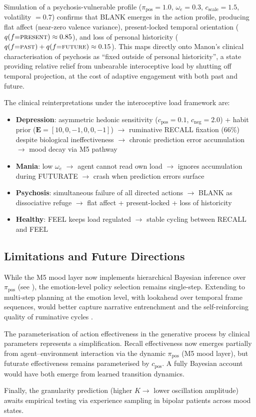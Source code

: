 \documentclass[11pt,a4paper]{article}
\begin{document}
Simulation of a psychosis-vulnerable profile ($\pi_{\text{pos}} = 1.0$, $\omega_e = 0.3$, $c_{\text{scale}} = 1.5$, volatility $= 0.7$) confirms that BLANK emerges in the action profile, producing flat affect (near-zero valence variance), present-locked temporal orientation ($q(f{=}\textsc{present}) \approx 0.85$), and loss of personal historicity ($q(f{=}\textsc{past}) + q(f{=}\textsc{future}) \approx 0.15$). This maps directly onto Manon's clinical characterisation of psychosis as ``fixed outside of personal historicity'', a state providing relative relief from unbearable interoceptive load by shutting off temporal projection, at the cost of adaptive engagement with both past and future.

The clinical reinterpretations under the interoceptive load framework are:
\begin{itemize}
    \item \textbf{Depression}: asymmetric hedonic sensitivity ($c_{\text{pos}} = 0.1$, $c_{\text{neg}} = 2.0$) + habit prior ($\mathbf{E} = [10, 0, -1, 0, 0, -1]$) $\to$ ruminative RECALL fixation (66\%) despite biological ineffectiveness $\to$ chronic prediction error accumulation $\to$ mood decay via M5 pathway
    \item \textbf{Mania}: low $\omega_e$ $\to$ agent cannot read own load $\to$ ignores accumulation during FUTURATE $\to$ crash when prediction errors surface
    \item \textbf{Psychosis}: simultaneous failure of all directed actions $\to$ BLANK as dissociative refuge $\to$ flat affect + present-locked + loss of historicity
    \item \textbf{Healthy}: FEEL keeps load regulated $\to$ stable cycling between RECALL and FEEL
\end{itemize}

\subsection{Limitations and Future Directions}

While the M5 mood layer now implements hierarchical Bayesian inference over $\pi_{\text{pos}}$ (see \citealt{albarracin2026temporal}), the emotion-level policy selection remains single-step. Extending to multi-step planning at the emotion level, with lookahead over temporal frame sequences, would better capture narrative entrenchment and the self-reinforcing quality of ruminative cycles \citep{hesp2021deeply}.

The parameterisation of action effectiveness in the generative process by clinical parameters represents a simplification. Recall effectiveness now emerges partially from agent--environment interaction via the dynamic $\pi_{\text{pos}}$ (M5 mood layer), but futurate effectiveness remains parameterised by $c_{\text{pos}}$. A fully Bayesian account would have both emerge from learned transition dynamics.

Finally, the granularity prediction (higher $K \to$ lower oscillation amplitude) awaits empirical testing via experience sampling in bipolar patients across mood states.



\end{document}
